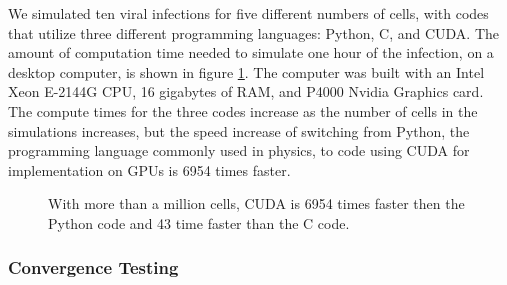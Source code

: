 We simulated ten viral infections for five different numbers of cells, with codes that utilize three different programming languages: Python, C, and CUDA. The amount of computation time needed to simulate one hour of the infection, on a desktop computer, is shown in figure \ref{fig:SpeedComparison}. The computer was built with an Intel Xeon E-2144G CPU, 16 gigabytes of RAM, and P4000 Nvidia Graphics card. The compute times for the three codes increase as the number of cells in the simulations increases, but the speed increase of switching from Python, the programming language commonly used in physics, to code using CUDA for implementation on GPUs is 6954 times faster.
\begin{figure}
    \centering
\caption{With more than a million cells, CUDA is 6954 times faster then the Python code and 43 time faster than the C code. \label{fig:SpeedComparison}}
\end{figure}

\subsubsection{Convergence Testing}

